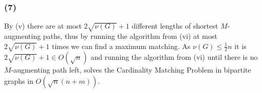 \documentclass{article}
\begin{document}
  \subsubsection*{(7)} By (v) there are at most $2\sqrt{\nu(G)}+1$ different lengths of shortest $M$-augmenting paths, thus by running the algorithm from (vi) at most $2\sqrt{\nu(G)}+1$ times we can find a maximum matching. As $\nu(G)\leq \frac 12 n$ it is  $2\sqrt{\nu(G)}+1\in O(\sqrt n)$ and running the algorithm from (vi) until there is no $M$-augmenting path left, solves the Cardinality Matching Problem in bipartite graphs in $O(\sqrt n (n+m))$.
\end{document}
